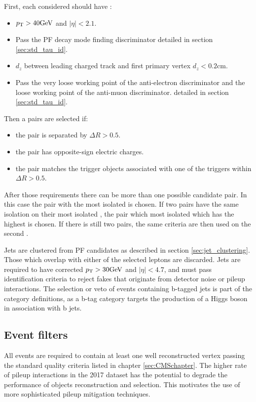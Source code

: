 First, each considered \tauh should have :
\begin{itemize}
    \item $p_{\mathrm{T}} > 40 \mathrm{GeV}$ and $|\eta| < 2.1$.
    \item Pass the PF decay mode finding discriminator detailed in section \ref{sec:std_tau_id}.
    \item $d_z$ between leading charged track and first primary vertex $d_z < 0.2 \mathrm{cm}$.
    \item Pass the very loose working point of the anti-electron discriminator and the loose working point of the anti-muon discriminator. detailed in section \ref{sec:std_tau_id}.
\end{itemize}
Then a \tauh\tauh pairs are selected if:
\begin{itemize}
    \item the pair is separated by $\Delta R > 0.5$.
    \item the pair has opposite-sign electric charges.
    \item the pair matches the trigger objects associated with one of the triggers within $\Delta R > 0.5$.
\end{itemize}

After those requirements there can be more than one possible candidate pair. In this case the pair with the most isolated \tauh is chosen. If two pairs have the same isolation on their most isolated \tauh, the pair which most isolated \tauh which has the highest \pt is chosen. If there is still two pairs, the same criteria are then used on the second \tauh.

Jets are clustered from PF candidates as described in section \ref{sec:jet_clustering}. Those which overlap with either of the selected leptons are discarded. Jets are required to have corrected $p_{\mathrm{T}} > 30 \mathrm{GeV}$ and $|\eta| < 4.7$, and must pass identification criteria to reject fakes that originate from detector noise or pileup interactions. The selection or veto of events containing b-tagged jets is part of the category definitions, as a b-tag category targets the production of a Higgs boson in association with b jets.


\subsection{Event filters}

All events are required to contain at least one well reconstructed vertex passing the standard quality criteria listed in chapter \ref{sec:CMSchapter}. The higher rate of pileup interactions in the 2017 dataset has the potential to degrade the performance of objects reconstruction and selection. This motivates the use of more sophisticated pileup mitigation techniques.

